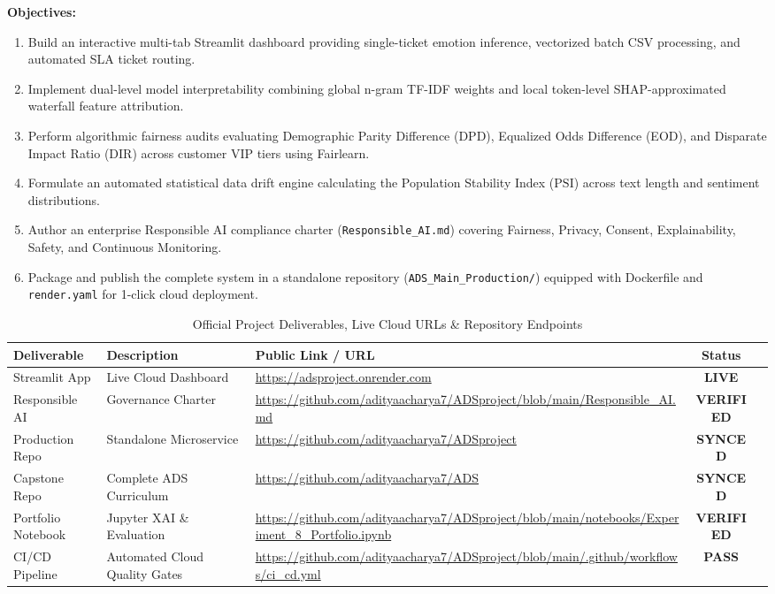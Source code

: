 \documentclass[11pt, a4paper]{article}
\begin{document}
\noindent \textbf{Objectives:}
\begin{enumerate}[leftmargin=2em]
    \item Build an interactive multi-tab Streamlit dashboard providing single-ticket emotion inference, vectorized batch CSV processing, and automated SLA ticket routing.
    \item Implement dual-level model interpretability combining global n-gram TF-IDF weights and local token-level SHAP-approximated waterfall feature attribution.
    \item Perform algorithmic fairness audits evaluating Demographic Parity Difference (DPD), Equalized Odds Difference (EOD), and Disparate Impact Ratio (DIR) across customer VIP tiers using Fairlearn.
    \item Formulate an automated statistical data drift engine calculating the Population Stability Index ($\text{PSI}$) across text length and sentiment distributions.
    \item Author an enterprise Responsible AI compliance charter (\texttt{Responsible\_AI.md}) covering Fairness, Privacy, Consent, Explainability, Safety, and Continuous Monitoring.
    \item Package and publish the complete system in a standalone repository (\texttt{ADS\_Main\_Production/}) equipped with Dockerfile and \texttt{render.yaml} for 1-click cloud deployment.
\end{enumerate}

\begin{table}[H]
\centering
\caption{Official Project Deliverables, Live Cloud URLs \& Repository Endpoints}
\label{tab:deliverables}
\small
\begin{tabular}{lllcc}
\toprule
\textbf{Deliverable} & \textbf{Description} & \textbf{Public Link / URL} & \textbf{Status} \\
\midrule
Streamlit App & Live Cloud Dashboard & \url{https://adsproject.onrender.com} & \textbf{LIVE} \\
Responsible AI & Governance Charter & \url{https://github.com/adityaacharya7/ADSproject/blob/main/Responsible_AI.md} & \textbf{VERIFIED} \\
Production Repo & Standalone Microservice & \url{https://github.com/adityaacharya7/ADSproject} & \textbf{SYNCED} \\
Capstone Repo & Complete ADS Curriculum & \url{https://github.com/adityaacharya7/ADS} & \textbf{SYNCED} \\
Portfolio Notebook & Jupyter XAI \& Evaluation & \url{https://github.com/adityaacharya7/ADSproject/blob/main/notebooks/Experiment_8_Portfolio.ipynb} & \textbf{VERIFIED} \\
CI/CD Pipeline & Automated Cloud Quality Gates & \url{https://github.com/adityaacharya7/ADSproject/blob/main/.github/workflows/ci_cd.yml} & \textbf{PASS} \\
\bottomrule
\end{tabular}
\end{table}
\end{document}
